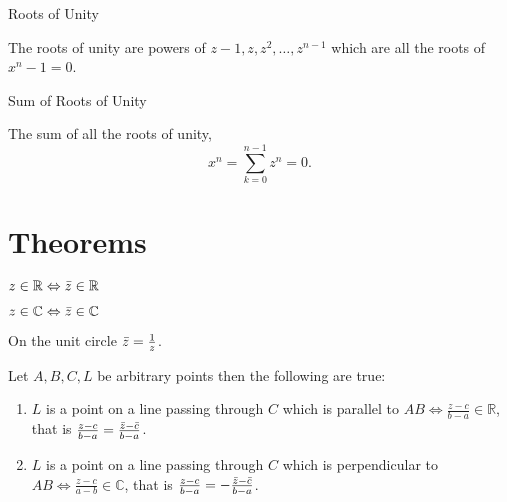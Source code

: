 \documentclass[10pt]{article}
\begin{document}
\begin{defn}{Roots of Unity}

The roots of unity are powers of $z - 1, z, z^{2}, \ldots, z^{n-1}$ which are all the roots of $x^{n} -1 = 0$.

\end{defn}

\medskip

\begin{defn}{Sum of Roots of Unity}

The sum of all the roots of unity, \[x^{n} = \sum^{n-1}_{k = 0} z^{n} = 0. \]

\end{defn}

\bigskip

\section*{Theorems}

\begin{fct}

$z \in \mathbb{R} \Leftrightarrow \bar{z} \in \mathbb{R}$

\end{fct}

\medskip

\begin{fct}

$ z \in \mathbb{C} \Leftrightarrow \bar{z} \in \mathbb{C} $

\end{fct}

\medskip

\begin{fct}

On the unit circle $\bar{z} = \frac{1}{z}$.

\end{fct}

\bigskip


\begin{thm}
Let $A, B, C, L$ be arbitrary points then the following are true:
\end{thm}

\begin{enumerate}
    \item $L$ is a point on a line passing through $C$ which is parallel to $AB \Leftrightarrow \frac{z - c}{b - a} \in \mathbb{R}$, that is $\frac{z - c}{b - a} = \frac{\bar{z} - \bar{c}}{b - a}$.
    \item $L$ is a point on a line passing through $C$ which is perpendicular to $AB \Leftrightarrow \frac{z -c}{a - b} \in \mathbb{C}$, that is $ \frac{z - c}{b - a} = - \frac{\bar{z} - \bar{c}}{b - a}$.
\end{enumerate}
\end{document}
